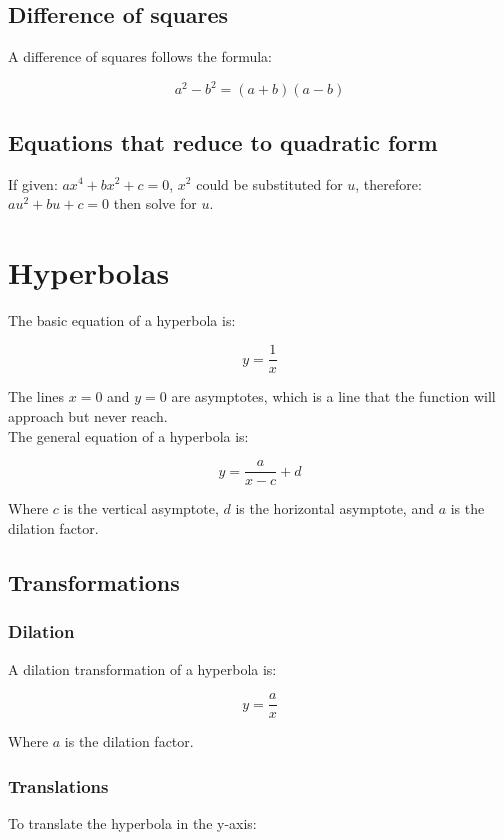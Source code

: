 \documentclass{book}
\begin{document}
\section{Difference of squares}
A difference of squares follows the formula:

\[
	a^2 - b^2 = (a + b)(a - b)
\]



\section{Equations that reduce to quadratic form}
If given: $ax^4 + bx^2 + c = 0$, $x^2$ could be substituted for $u$, therefore: $au^2 + bu + c = 0$ then solve for $u$.




\chapter{Hyperbolas}
The basic equation of a hyperbola is:

\[
	y = \frac{1}{x}
\]

The lines $x = 0$ and $y = 0$ are asymptotes, which is a line that the function will approach but never reach.\\

The general equation of a hyperbola is:

\[
	y = \frac{a}{x - c} + d
\]

Where $c$ is the vertical asymptote, $d$ is the horizontal asymptote, and $a$ is the dilation factor.



\section{Transformations}
\subsection{Dilation}
A dilation transformation of a hyperbola is:

\[
	y = \frac{a}{x}
\]

Where $a$ is the dilation factor.


\subsection{Translations}
To translate the hyperbola in the y-axis:
\end{document}
